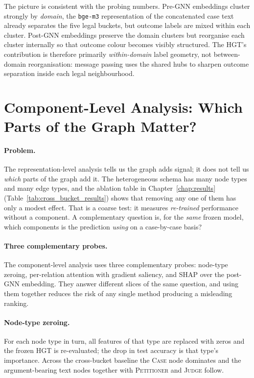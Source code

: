 The picture is consistent with the probing numbers. Pre-GNN
embeddings cluster strongly by \emph{domain}, the \texttt{bge-m3}
representation of the concatenated case text already separates the
five legal buckets, but outcome labels are mixed within each
cluster. Post-GNN embeddings preserve the domain clusters but
reorganise each cluster internally so that outcome colour becomes
visibly structured. The HGT's contribution is therefore primarily
\emph{within-domain} label geometry, not between-domain
reorganisation: message passing uses the shared hubs to sharpen
outcome separation inside each legal neighbourhood.

\section{Component-Level Analysis: Which Parts of the Graph Matter?}
\label{sec:component_analysis}

\paragraph{Problem.}
The representation-level analysis tells us the graph adds signal; it
does not tell us \emph{which} parts of the graph add it. The
heterogeneous schema has many node types and many edge types, and the
ablation table in Chapter~\ref{chap:results}
(Table~\ref{tab:cross_bucket_results}) shows that removing any one of
them has only a modest effect. That is a coarse test: it measures
\emph{re-trained} performance without a component. A complementary
question is, for the \emph{same} frozen model, which components is
the prediction \emph{using} on a case-by-case basis?

\paragraph{Three complementary probes.}
The component-level analysis uses three complementary probes: node-type
zeroing, per-relation attention with gradient saliency, and SHAP over
the post-GNN embedding. They answer different slices of the same
question, and using them together reduces the risk of any single method
producing a misleading ranking.

\paragraph{Node-type zeroing.}
For each node type in turn, all features of that type are replaced
with zeros and the frozen HGT is re-evaluated; the drop in test
accuracy is that type's importance. Across the cross-bucket baseline
the \textsc{Case} node dominates and the argument-bearing text nodes
together with \textsc{Petitioner} and \textsc{Judge} follow.

